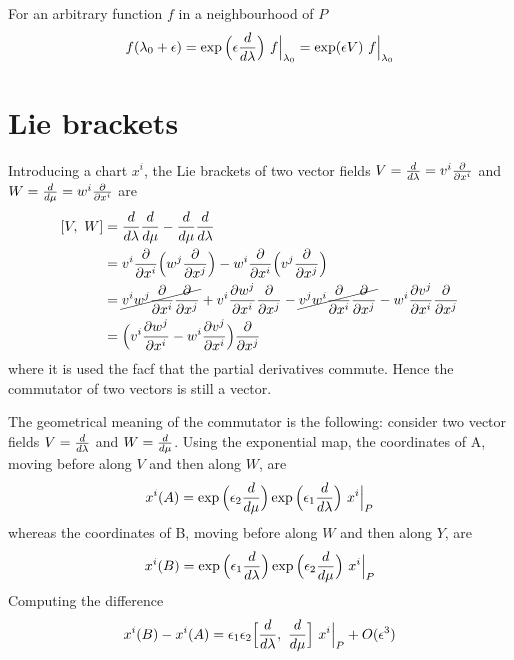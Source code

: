     For an arbitrary function $f$ in a neighbourhood of $P$
    \begin{equation*}
        f(\lambda_0 + \epsilon) = \exp \Big(\epsilon \frac{d}{d\lambda} \Big) ~ f \Big\vert_{\lambda_0} = \exp (\epsilon V ) ~ f \Big\vert_{\lambda_0}
    \end{equation*}

\section{Lie brackets}

    Introducing a chart $x^i$, the Lie brackets of two vector fields $V = \frac{d}{d\lambda} = v^i \frac{\partial}{\partial x^i}$ and $W = \frac{d}{d\mu} = w^i \frac{\partial}{\partial x^i}$ are 
    \begin{equation*}
    \begin{aligned}
        [V, ~W] & = \dv{}{\lambda} \dv{}{\mu} - \dv{}{\mu} \dv{}{\lambda} \\ & = v^i \pdv{}{x^i} \Big( w^j \pdv{}{x^j} \Big) - w^i \pdv{}{x^i} \Big( v^j \pdv{}{x^j} \Big) \\ & = \cancel{v^i w^j \pdv{}{x^i} \pdv{}{x^j}} + v^i \pdv{w^j}{x^i} \pdv{}{x^j} - \cancel{v^j w^i \pdv{}{x^i} \pdv{}{x^j}} - w^i \pdv{v^j}{x^i} \pdv{}{x^j} \\ & = \Big ( v^i \pdv{w^j}{x^i} - w^i \pdv{v^j}{x^i} \Big ) \pdv{}{x^j} 
    \end{aligned}
    \end{equation*}
    where it is used the facf that the partial derivatives commute. Hence the commutator of two vectors is still a vector. 

    The geometrical meaning of the commutator is the following: consider two vector fields $V = \frac{d}{d\lambda}$ and $W = \frac{d}{d\mu}$. Using the exponential map, the coordinates of A, moving before along $V$ and then along $W$, are 
    \begin{equation*}
        x^i(A) = \exp \Big ( \epsilon_2 \frac{d}{d\mu} \Big) \exp \Big ( \epsilon_1 \frac{d}{d\lambda} \Big) ~ x^i \Big\vert_P
    \end{equation*}
    whereas the coordinates of B, moving before along $W$ and then along $Y$, are 
    \begin{equation*}
        x^i(B) = \exp \Big ( \epsilon_1 \frac{d}{d\lambda} \Big) \exp \Big ( \epsilon_2 \frac{d}{d\mu} \Big) ~ x^i \Big\vert_P
    \end{equation*}
    Computing the difference
    \begin{equation*}
        x^i(B) - x^i(A) = \epsilon_1 \epsilon_2 \Big [\frac{d}{d\lambda}, ~\frac{d}{d\mu} \Big ] ~ x^i \Big\vert_P + O(\epsilon^3)
    \end{equation*}

